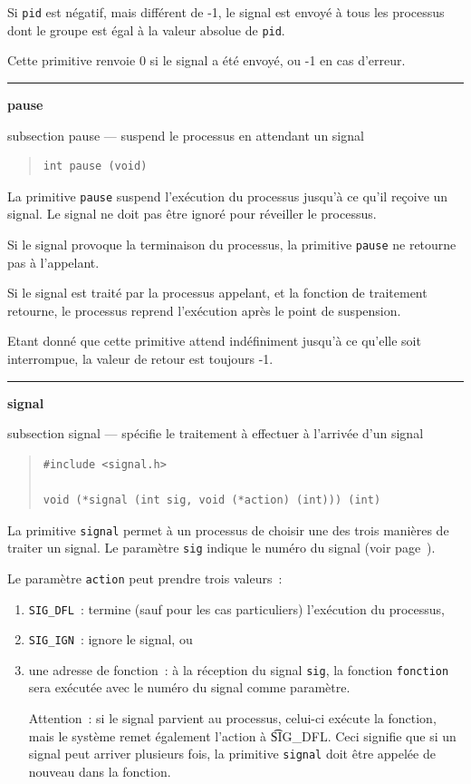 \documentclass [twoside] {report}
\newcommand {\primitive} [1]
    {
	\phantomsection
	{\large \textbf {#1}}
	\addcontentsline {toc} {subsection} {#1}
    }
\newcommand {\separation}
    {
	\vspace {5mm}
	\nopagebreak
	\hrule
    }
\begin{document}
Si \texttt {pid} est négatif, mais différent de -1, le
signal est envoyé à tous les processus dont le
groupe est égal à la valeur absolue de \texttt {pid}.

Cette primitive renvoie 0 si le signal a été
envoyé, ou -1 en cas d'erreur.




\separation
\primitive {pause} --- suspend le processus en attendant un signal

\begin {quote}
\begin {verbatim}
int pause (void)
\end{verbatim}
\end {quote}

La primitive \texttt {pause} suspend l'exécution du
processus jusqu'à ce qu'il reçoive un signal. Le
signal ne doit pas être ignoré pour réveiller le
processus.

Si le signal provoque la terminaison du
processus, la primitive \texttt {pause} ne retourne pas à
l'appelant.

Si le signal est traité par la processus
appelant, et la fonction de traitement retourne,
le processus reprend l'exécution après le point de
suspension.

Etant donné que cette primitive attend indéfiniment jusqu'à
ce qu'elle soit interrompue, la valeur de retour est toujours -1.



\separation
\primitive {signal} --- spécifie le traitement à effectuer à l'arrivée d'un signal

\begin {quote}
\begin {verbatim}
#include <signal.h>

void (*signal (int sig, void (*action) (int))) (int)
\end{verbatim}
\end {quote}

La primitive \texttt {signal} permet à un processus de
choisir une des trois manières de traiter un
signal. Le paramètre \texttt {sig} indique le numéro
du signal (voir page~\pageref {ps:sigv7}).

Le paramètre \texttt {action} peut prendre trois
valeurs~:

\begin {enumerate}
    \item \texttt {SIG\_DFL}~: termine (sauf pour les cas
	particuliers) l'exécution du processus,
    \item \texttt {SIG\_IGN}~: ignore le signal, ou
    \item une adresse de fonction~: à la réception du
	signal \texttt {sig}, la fonction \texttt {fonction} sera
	exécutée avec le numéro du signal comme paramètre.

	Attention~: si le signal parvient au processus,
	celui-ci exécute la fonction, mais le système
	remet également l'action à {\t SIG\_DFL}. Ceci
	signifie que si un signal peut arriver plusieurs
	fois, la primitive \texttt {signal} doit être appelée
	de nouveau dans la fonction.
\end {enumerate}
\end{document}
